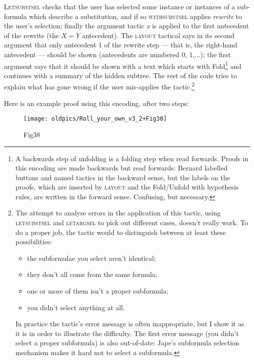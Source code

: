 \textsc{Letsubstsel} checks that the user has selected some instance or instances of a sub-formula which describe a substitution, and if so \textsc{withsubstsel} applies \textit{rewrite} to the user's selection; finally the argument tactic \textit{x} is applied to the first antecedent of the rewrite (the $X=Y$ antecedent). The \textsc{layout} tactical says in its second argument that only antecedent 1 of the rewrite step --- that is, the right-hand antecedent --- should be shown (antecedents are numbered 0, 1,...); the first argument says that it should be shown with a text which starts with Fold\footnote{A backwards step of unfolding is a folding step when read forwards. Proofs in this encoding are made backwards but read forwards: Bernard labelled buttons and named tactics in the backward sense, but the labels on the proofs, which are inserted by \textsc{layout} and the Fold/Unfold with hypothesis rules, are written in the forward sense. Confusing, but necessary.} and continues with a summary of the hidden subtree. The rest of the code tries to explain what has gone wrong if the user mis-applies the tactic.\footnote{The attempt to analyse errors in the application of this tactic, using \textsc{letsubstsel} and \textsc{letargsel} to pick out different cases, doesn't really work. To do a proper job, the tactic would to distinguish between at least these possibilities:
\begin{itemize}
\item the subformulae you select aren't identical;
\item they don't all come from the same formula;
\item one or more of them isn't a proper subformula;
\item you didn't select anything at all.
\end{itemize}

In practice the tactic's error message is often inappropriate, but I show it as it is in order to illustrate the difficulty. The first error message (you didn't select a proper subformula) is also out-of-date: Jape's subformula selection mechanism makes it hard not to select a subformula.}

Here is an example proof using this encoding, after two steps:

\begin{figure}[htbp] \begin{center} \texttt{[image: oldpics/Roll\_your\_own\_v3\_2+Fig38]} \caption{Fig38} \end{center} \end{figure}


